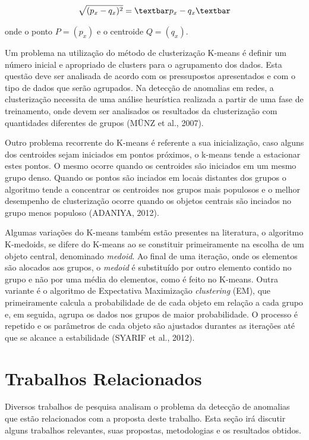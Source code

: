 \documentclass[12pt,openright,oneside,a4paper,english,spanish,brazil]{unifil}
\begin{document}
\begin{equation} 
\label{eq:Distância Euclidiana} %
\sqrt{(p_{x} - q_{x})^{2}} = \textbar p_{x} - q_{x} \textbar 
\end{equation}

\noindent onde o ponto $P = (p_{x})$ e o centroide $Q = (q_{x})$.

\indent Um problema na utilização do método de clusterização K-means é definir um número inicial e  apropriado de clusters para o agrupamento dos dados. Esta questão deve ser analisada de acordo com os pressupostos apresentados e com o tipo de dados que serão agrupados. Na detecção de anomalias em redes, a clusterização necessita de uma análise heurística realizada a partir de uma fase de treinamento, onde devem ser analisados os resultados da clusterização com quantidades diferentes de grupos (MÜNZ et al., 2007).

\indent Outro problema recorrente do K-means é referente a sua inicialização, caso alguns dos centroides sejam iniciados em pontos próximos, o k-means tende a estacionar estes pontos. O mesmo ocorre quando os centroides são iniciados em um mesmo grupo denso. Quando os pontos são inciados em locais distantes dos grupos o algoritmo tende a concentrar os centroides nos grupos mais populosos e o melhor desempenho de clusterização ocorre quando os objetos centrais são inciados no grupo menos populoso (ADANIYA, 2012).

\indent Algumas variações do K-means também estão presentes na literatura, o algoritmo K-medoids, se difere do K-means ao se constituir primeiramente na escolha de um objeto central, denominado \textit{medoid}. Ao final de uma iteração, onde os elementos são alocados aos grupos, o \textit{medoid} é substituído por outro elemento contido no grupo e não por uma média do elementos, como é feito no K-means. Outra variante é o algoritmo de Expectativa Maximização \textit{clustering} (EM), que primeiramente calcula a probabilidade de de cada objeto em relação a cada grupo e, em seguida, agrupa os dados nos grupos de maior probabilidade. O processo é repetido e os parâmetros de cada objeto são ajustados durantes as iterações até que se alcance a estabilidade (SYARIF et al., 2012). 

  \section{Trabalhos Relacionados}

\indent Diversos trabalhos de pesquisa analisam o problema da detecção de anomalias que estão relacionados com a proposta deste trabalho. Esta seção irá discutir alguns trabalhos relevantes, suas propostas, metodologias e os resultados obtidos.
\end{document}
